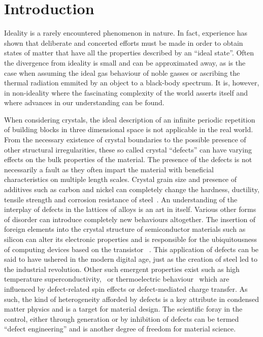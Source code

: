 
\section{Introduction}

Ideality is a rarely encountered phenomenon in nature. In fact,
experience has shown that deliberate and concerted efforts 
must be made in order to obtain states of matter that have all
the properties described by an ``ideal state''.
Often the divergence from ideality is small and can be approximated 
away, as is the case when assuming the ideal gas behaviour 
of noble gasses or ascribing the thermal radiation emmited by an object
to a black-body spectrum. It is, however, in non-ideality where the 
fascinating complexity of the world asserts itself and where 
advances in our understanding can be found. 

When considering crystals, the ideal description of an infinite
periodic repetition of building blocks in three dimensional space is
not applicable in the real world. From the necessary existence of 
crystal boundaries to the possible presence of other structural
irregularities, these so called crystal ``defects'' can have
varying effects on the bulk properties of the material.
The presence of the defects is not necessarily a fault as
they often impart the material with beneficial characteristics
on multiple length scales.
Crystal grain size and presence of additives such as 
carbon and nickel can completely change the hardness, 
ductility, tensile strength and corrosion resistance
of steel~\cite{reed-hillPhysicalMetallurgyPrinciples1992}. 
An understanding of the interplay of defects in the 
lattices of alloys is an art in itself. Various other forms 
of disorder can introduce completely new behaviours altogether.
The insertion of foreign elements into the crystal structure
of semiconductor materials such as silicon can alter its 
electronic properties and is responsible for the ubiquitousness
of computing devices based on the transistor
~\cite{levyMicroelectronicMaterialsProcesses1989}. This application
of defects can be said to have ushered in the modern digital age,
just as the creation of steel led to the industrial revolution.
Other such emergent properties exist such as high temperature 
superconductivity,~\cite{leggettWhatWeKnow2006} or thermoelectric 
behaviour~\cite{peiBandEngineeringThermoelectric2012} which are influenced
by defect-related spin effects or defect-mediated charge transfer.
As such, the kind of heterogeneity afforded by defects is a key attribute 
in condensed matter physics and is a target for material design.
The scientific foray in the control, either through generation or
by inhibition of defects can be termed ``defect engineering'' and is
another degree of freedom for material science.

